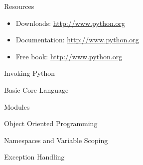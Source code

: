 \documentclass[mathserif,20pt,xcolor=table,compress,aspectratio=169]{beamer}
\begin{document}
\begin{frame}{Resources}
\begin{itemize}
\item
Downloads:
\url{http://www.python.org}
\item
Documentation:
\url{http://www.python.org}
\item Free book:
\url{http://www.python.org}
\end{itemize}
\end{frame}




\begin{frame}{Invoking Python}

\end{frame}





\begin{frame}[plain]
\sectionpage
\end{frame}


\begin{frame}{Basic Core Language}


\end{frame}


\begin{frame}{Modules}
\end{frame}


\begin{frame}{Object Oriented Programming}
\end{frame}


\begin{frame}{Namespaces and Variable Scoping}
\end{frame}


\begin{frame}{Exception Handling}
\end{frame}
\end{document}
